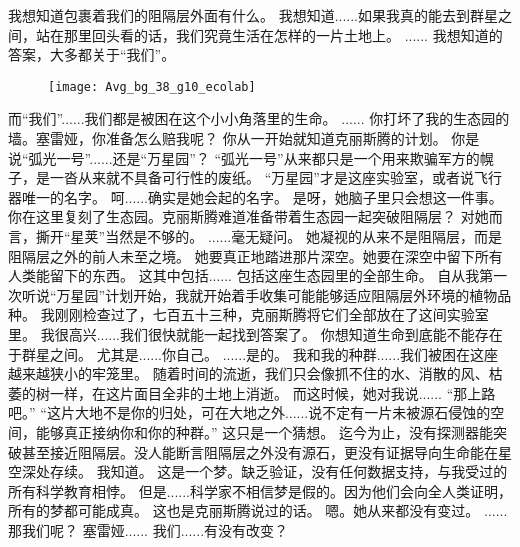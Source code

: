 \documentclass[openany]{book}
\begin{document}
\begin{dialogue}
     我想知道包裹着我们的阻隔层外面有什么。
     我想知道......如果我真的能去到群星之间，站在那里回头看的话，我们究竟生活在怎样的一片土地上。
     ......
     我想知道的答案，大多都关于“我们”。
    \begin{figure}[h]
        \centering
        \texttt{[image: Avg\_bg\_38\_g10\_ecolab]}
    \end{figure}
     而“我们”......我们都是被困在这个小小角落里的生命。
     ......
     你打坏了我的生态园的墙。塞雷娅，你准备怎么赔我呢？
     你从一开始就知道克丽斯腾的计划。
     你是说“弧光一号”......还是“万星园”？
     “弧光一号”从来都只是一个用来欺骗军方的幌子，是一沓从来就不具备可行性的废纸。
     “万星园”才是这座实验室，或者说飞行器唯一的名字。
     呵......确实是她会起的名字。
     是呀，她脑子里只会想这一件事。
     你在这里复刻了生态园。克丽斯腾难道准备带着生态园一起突破阻隔层？
     对她而言，撕开“星荚”当然是不够的。
     ......毫无疑问。
     她凝视的从来不是阻隔层，而是阻隔层之外的前人未至之境。
     她要真正地踏进那片深空。她要在深空中留下所有人类能留下的东西。
     这其中包括......
     包括这座生态园里的全部生命。
     自从我第一次听说“万星园”计划开始，我就开始着手收集可能能够适应阻隔层外环境的植物品种。
     我刚刚检查过了，七百五十三种，克丽斯腾将它们全部放在了这间实验室里。
     我很高兴......我们很快就能一起找到答案了。
     你想知道生命到底能不能存在于群星之间。
     尤其是......你自己。
     ......是的。
     我和我的种群......我们被困在这座越来越狭小的牢笼里。
     随着时间的流逝，我们只会像抓不住的水、消散的风、枯萎的树一样，在这片面目全非的土地上消逝。
     而这时候，她对我说......
     “那上路吧。”
     “这片大地不是你的归处，可在大地之外......说不定有一片未被源石侵蚀的空间，能够真正接纳你和你的种群。”
     这只是一个猜想。
     迄今为止，没有探测器能突破甚至接近阻隔层。没人能断言阻隔层之外没有源石，更没有证据导向生命能在星空深处存续。
     我知道。
     这是一个梦。缺乏验证，没有任何数据支持，与我受过的所有科学教育相悖。
     但是......科学家不相信梦是假的。因为他们会向全人类证明，所有的梦都可能成真。
     这也是克丽斯腾说过的话。
     嗯。她从来都没有变过。
     ......
     那我们呢？
     塞雷娅......
     我们......有没有改变？
\end{dialogue}\par
\end{document}
